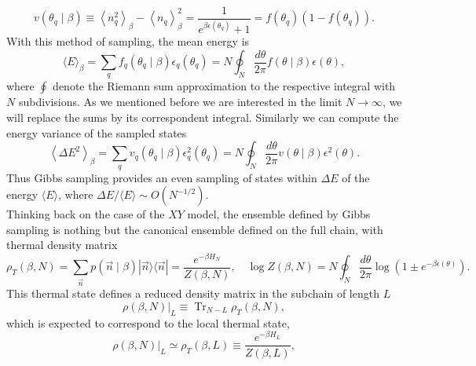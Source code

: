 \begin{equation}
v\left(\theta_{q} \mid \beta\right) \equiv\left\langle n_{q}^{2}\right\rangle_{\beta}-\left\langle n_{q}\right\rangle_{\beta}^{2}=\frac{1}{e^{\beta \epsilon\left(\theta_{q}\right)} + 1}=f\left(\theta_{q}\right)\left(1 - f\left(\theta_{q}\right)\right).
\end{equation}
With this method of sampling, the mean energy is 
\begin{equation}
\langle E\rangle_{\beta}=\sum_{q} f_{q}\left(\theta_{q} \mid \beta\right) \epsilon_{q}\left(\theta_{q}\right)=N \oint_{N} \frac{d \theta}{2 \pi} f(\theta \mid \beta) \epsilon(\theta),
\end{equation}
where $\oint$ denote the Riemann sum approximation to the respective integral with $N$ subdivisions. As we mentioned before we are interested in the limit $N\to\infty$, we will replace the sums by its correspondent integral. Similarly we can compute the energy variance of the sampled states 
\begin{equation}
\left\langle\Delta E^{2}\right\rangle_{\beta}=\sum_{q} v_{q}\left(\theta_{q} \mid \beta\right) \epsilon_{q}^{2}\left(\theta_{q}\right)=N \oint_{N} \frac{d \theta}{2 \pi} v(\theta \mid \beta) \epsilon^{2}(\theta).
\end{equation}
Thus Gibbs sampling provides an even sampling of states within $\Delta E$ of the energy $\langle E\rangle$, where $\Delta E/\langle E\rangle\sim O(N^{-1/2})$.\\
Thinking back on the case of the $XY$ model, the ensemble defined by Gibbs sampling is nothing but the canonical ensemble defined on the full chain, with thermal density matrix
\begin{equation}
\rho_{T}(\beta, N)=\sum_{\vec{n}} p(\vec{n} \mid \beta)|\vec{n}\rangle\langle\vec{n}|=\frac{e^{-\beta H_{N}}}{Z(\beta, N)}, \quad \log Z(\beta, N)= N  \oint_{N} \frac{d \theta}{2 \pi}\log \left(1 \pm e^{-\beta \epsilon(\theta)}\right).
\end{equation}
This thermal state defines a reduced density matrix in the subchain of length $L$
\begin{equation}
\left.\rho(\beta, N)\right|_{L} \equiv \operatorname{Tr}_{N-L} \rho_{T}(\beta, N),
\end{equation}
which is expected to correspond to the local thermal state,
\begin{equation}
 \left.\rho(\beta, N)\right|_{L} \simeq \rho_{T}(\beta, L) \equiv \frac{e^{-\beta H_{L}}}{Z(\beta, L)},
\end{equation}
